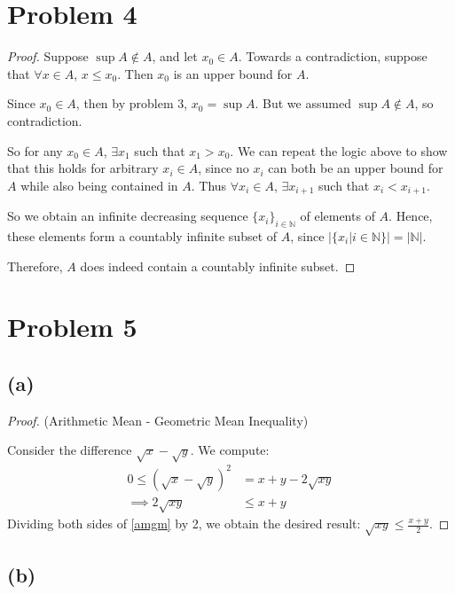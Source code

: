\documentclass{article}
\begin{document}
\section*{Problem 4}
\begin{proof}
	Suppose $\sup{A}\notin A$, and let $x_0 \in A$. Towards a contradiction, suppose that $\forall x \in A$, $x \leq x_0$. Then $x_0$ is an upper bound for $A$.
	
	Since $x_0 \in A$, then by problem 3, $x_0 = \sup{A}$. But we assumed $\sup{A} \notin A$, so contradiction.
	
	So for any $x_0 \in A$, $\exists x_1$ such that $x_1 > x_0$. We can repeat the logic above to show that this holds for arbitrary $x_i \in A$, since no $x_i$ can both be an upper bound for $A$ while also being contained in $A$. Thus $\forall x_i \in A$, $\exists x_{i+1}$ such that $x_i < x_{i+1}$. 
	
	So we obtain an infinite decreasing sequence $\{x_i\}_{i \in \mathbb{N}}$ of elements of $A$. Hence, these elements form a countably infinite subset of $A$, since $|\{x_i | i \in \mathbb{N}\}| = |\mathbb{N}|$.
	
	Therefore, $A$ does indeed contain a countably infinite subset.
\end{proof}

\section*{Problem 5}
\subsection*{(a)}
\begin{proof}
	(Arithmetic Mean - Geometric Mean Inequality)
	
	Consider the difference $\sqrt{x} - \sqrt{y}$. We compute:
	\begin{align}
		0 \leq \left(\sqrt{x} - \sqrt{y}\right)^2 &= x + y -2 \sqrt{xy} \\
		\implies 2\sqrt{xy} &\leq x + y \label{amgm}
	\end{align} 
	Dividing both sides of \eqref{amgm} by 2, we obtain the desired result: $\sqrt{xy} \leq \frac{x + y}{2}$.
\end{proof}
\subsection{(b)}
\end{document}
